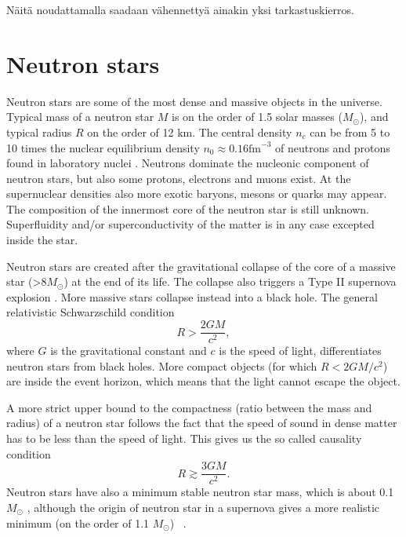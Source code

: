 \documentclass{wihuri}
\def\be{\begin{equation}}
\def\ee{\end{equation}}
\begin{document}
Näitä noudattamalla saadaan vähennettyä ainakin yksi tarkastuskierros.

\fi

\section{Neutron stars}


Neutron stars are some of the most dense and massive objects in the
universe. Typical mass of a neutron star $M$ is on the order of 1.5 solar masses ($M_{\odot}$), and typical radius $R$ on the order of 12 km. The central density $n_{c}$ can be from 5 to 10 times the nuclear equilibrium density $n_{0} \approx 0.16 \mathrm{fm}^{-3}$ of neutrons and protons found in laboratory nuclei \cite{lattimer}. Neutrons dominate the nucleonic component of neutron stars, but also some protons, electrons and muons exist. At the supernuclear densities also more exotic baryons, mesons or quarks may appear. The composition of the innermost core of the neutron star is still unknown. Superfluidity and/or superconductivity of the matter %
is in any case excepted inside the star. 

 
Neutron stars are created after the gravitational collapse of the core of a
massive star (>8$M_{\odot}$) at the end of its life. The collapse also triggers a Type II supernova explosion \cite{lattimer}. More massive stars collapse instead into a black hole. The general relativistic Schwarzschild condition 
\be \label{eq:schw_cond}
 R > \frac{2GM}{c^{2}},
\ee 
where $G$ is the gravitational constant and $c$ is the speed of light, %
differentiates neutron stars from black holes. More compact objects (for which $R < 2GM/c^{2}$) are inside the event horizon, which means that the light cannot escape the object.


A more strict upper bound to the compactness (ratio between the mass and radius) of a neutron star follows
the fact \cite{rhoades} %
that the speed of sound in dense matter has to be less than the speed of light. This gives us the so called causality condition
\be \label{eq:causality}
 R \gtrsim \frac{3GM}{c^{2}}.
\ee 
Neutron stars have also a minimum stable neutron star mass, which is about 0.1 $M_{\odot}$ , although the origin of neutron star in a supernova gives a more realistic minimum (on the order of 1.1 $M_{\odot}$) ~\cite{lattimer2013}.
\end{document}

